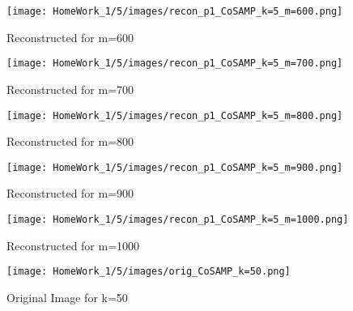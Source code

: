 \documentclass{article}
\begin{document}
\begin{figure}[h!]
    \begin{minipage}{0.1\textwidth}
        \centering
        \texttt{[image: HomeWork\_1/5/images/recon\_p1\_CoSAMP\_k=5\_m=600.png]}
        \caption{Reconstructed for m=600}
    \end{minipage}
    \hspace{0.5cm}
    \begin{minipage}{0.1\textwidth}
        \centering
        \texttt{[image: HomeWork\_1/5/images/recon\_p1\_CoSAMP\_k=5\_m=700.png]}
        \caption{Reconstructed for m=700}
    \end{minipage}
    \hspace{0.5cm}
    \begin{minipage}{0.1\textwidth}
        \centering
        \texttt{[image: HomeWork\_1/5/images/recon\_p1\_CoSAMP\_k=5\_m=800.png]}
        \caption{\small Reconstructed for m=800}
    \end{minipage}
    \hspace{0.5cm}
    \begin{minipage}{0.1\textwidth}
        \centering
        \texttt{[image: HomeWork\_1/5/images/recon\_p1\_CoSAMP\_k=5\_m=900.png]}
        \caption{Reconstructed for m=900}
    \end{minipage}
    \hspace{0.5cm}
    \begin{minipage}{0.1\textwidth}
        \centering
        \texttt{[image: HomeWork\_1/5/images/recon\_p1\_CoSAMP\_k=5\_m=1000.png]}
        \caption{Reconstructed for m=1000}
    \end{minipage}
\end{figure}

\begin{figure}[h!]
        \centering
        \texttt{[image: HomeWork\_1/5/images/orig\_CoSAMP\_k=50.png]}
        \caption{Original Image for k=50}
\end{figure}
\end{document}

